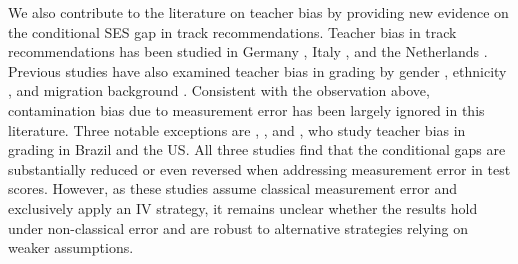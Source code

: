 We also contribute to the literature on teacher bias by providing new evidence on the conditional SES gap in track recommendations. Teacher bias in track recommendations has been studied in Germany \citep{falk2023mentoring}, Italy \citep{carlana2022implicit}, and the Netherlands \citep{zumbuehl2025can}. Previous studies have also examined teacher bias in grading by gender \citep{cornwell2013noncognitive,lavy2018origins,terrier2020boys}, ethnicity \citep{burgess2013test}, and migration background \citep{alesina2024revealing}. Consistent with the observation above, contamination bias due to measurement error has been largely ignored in this literature. Three notable exceptions are \citet{botelho2015racial}, \cite{ferman2022assessing}, and \cite{zhu2024}, who study teacher bias in grading in Brazil and the US. All three studies find that the conditional gaps are substantially reduced or even reversed when addressing measurement error in test scores. However, as these studies assume classical measurement error and exclusively apply an IV strategy, it remains unclear whether the results hold under non-classical error and are robust to alternative strategies relying on weaker assumptions.

